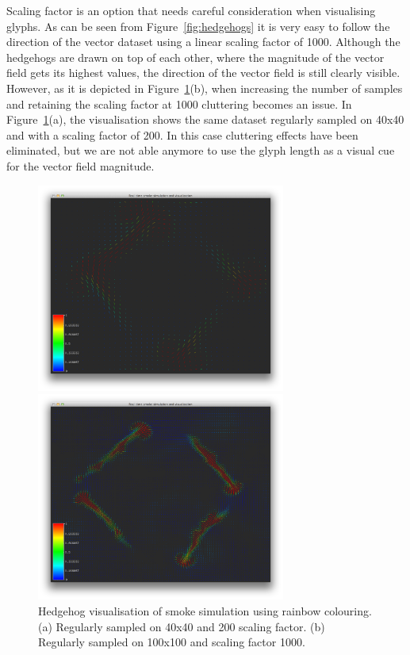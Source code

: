 Scaling factor is an option that needs careful consideration when visualising glyphs. As can be seen from Figure~\ref{fig:hedgehogs} it is very easy to follow the direction of the vector dataset using a linear scaling factor of 1000. Although the hedgehogs are drawn on top of each other, where the magnitude of the vector field gets its highest values, the direction of the vector field is still clearly visible. However, as it is depicted in Figure~\ref{fig:hedgehogsSamplesScaling}(b), when increasing the number of samples and retaining the scaling factor at 1000 cluttering becomes an issue. In Figure~\ref{fig:hedgehogsSamplesScaling}(a), the visualisation shows the same dataset regularly sampled on 40x40 and with a scaling factor of 200. In this case cluttering effects have been eliminated, but we are not able anymore to use the glyph length as a visual cue for the vector field magnitude.

\begin{figure}[htbp]
\centering
\begin{minipage}[t]{0.48\textwidth}
\includegraphics[height=2.7in]{figures/glyph/hedgehogsLSSSF.png}
\end{minipage}
\begin{minipage}[t]{0.48\textwidth}
\includegraphics[height=2.7in]{figures/glyph/hedgehogsMSDSF.png}
\end{minipage}
\caption{Hedgehog visualisation of smoke simulation using rainbow colouring. (a) Regularly sampled on 40x40 and 200 scaling factor. (b) Regularly sampled on 100x100 and scaling factor 1000.}
\label{fig:hedgehogsSamplesScaling}
\end{figure}


